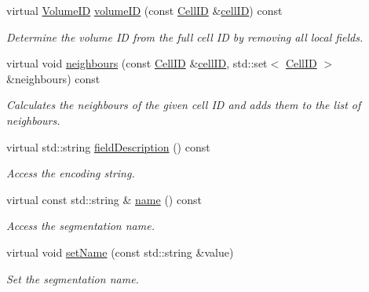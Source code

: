 \begin{DoxyCompactItemize}
virtual \hyperlink{namespace_d_d4hep_1_1_d_d_segmentation_a61a6833a18d1800bdef176595f83e3ba}{Volume\+ID} \hyperlink{class_d_d4hep_1_1_d_d_segmentation_1_1_segmentation_a43c0e9648e3b7cded015847c0802f757}{volume\+ID} (const \hyperlink{namespace_d_d4hep_1_1_d_d_segmentation_ac7af071d85cb48820914434a07e21ba1}{Cell\+ID} \&\hyperlink{class_d_d4hep_1_1_d_d_segmentation_1_1_segmentation_ad5a60953d96d409850d8192f64f8ce3c}{cell\+ID}) const
\begin{DoxyCompactList}\small\item\em Determine the volume ID from the full cell ID by removing all local fields. \end{DoxyCompactList}\item 
virtual void \hyperlink{class_d_d4hep_1_1_d_d_segmentation_1_1_segmentation_af55e771cfd7effd0f86c4575e422891b}{neighbours} (const \hyperlink{namespace_d_d4hep_1_1_d_d_segmentation_ac7af071d85cb48820914434a07e21ba1}{Cell\+ID} \&\hyperlink{class_d_d4hep_1_1_d_d_segmentation_1_1_segmentation_ad5a60953d96d409850d8192f64f8ce3c}{cell\+ID}, std\+::set$<$ \hyperlink{namespace_d_d4hep_1_1_d_d_segmentation_ac7af071d85cb48820914434a07e21ba1}{Cell\+ID} $>$ \&neighbours) const
\begin{DoxyCompactList}\small\item\em Calculates the neighbours of the given cell ID and adds them to the list of neighbours. \end{DoxyCompactList}\item 
virtual std\+::string \hyperlink{class_d_d4hep_1_1_d_d_segmentation_1_1_segmentation_a45536a3376bac79c20e03a013ffb15be}{field\+Description} () const
\begin{DoxyCompactList}\small\item\em Access the encoding string. \end{DoxyCompactList}\item 
virtual const std\+::string \& \hyperlink{class_d_d4hep_1_1_d_d_segmentation_1_1_segmentation_a8c2f56170b912ef5e5c380169939c56e}{name} () const
\begin{DoxyCompactList}\small\item\em Access the segmentation name. \end{DoxyCompactList}\item 
virtual void \hyperlink{class_d_d4hep_1_1_d_d_segmentation_1_1_segmentation_a9bfa16e70ac68d6013c49be45b3438c3}{set\+Name} (const std\+::string \&value)
\begin{DoxyCompactList}\small\item\em Set the segmentation name. \end{DoxyCompactList}\item 

\end{DoxyCompactItemize}
